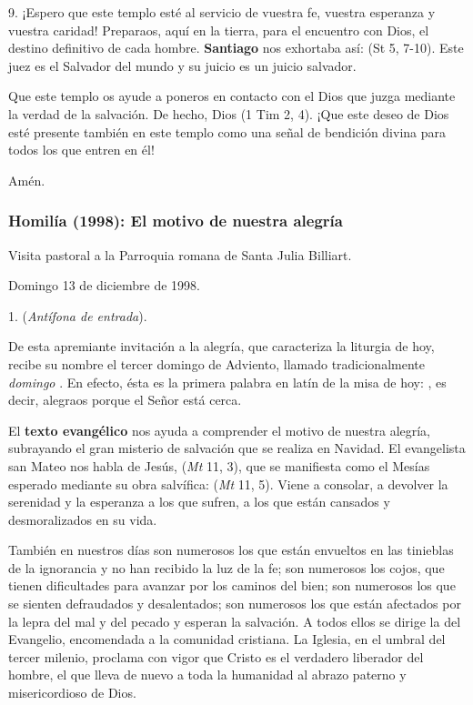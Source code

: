 9. ¡Espero que este templo esté al servicio de vuestra fe, vuestra esperanza y vuestra caridad! Preparaos, aquí en la tierra, para el encuentro con Dios, el destino definitivo de cada hombre. \textbf{Santiago} nos exhortaba así:  (St 5, 7-10). Este juez es el Salvador del mundo y su juicio es un juicio salvador.

Que este templo os ayude a poneros en contacto con el Dios que juzga mediante la verdad de la salvación. De hecho, Dios  (1 Tim 2, 4). ¡Que este deseo de Dios esté presente también en este templo como una señal de bendición divina para todos los que entren en él!

Amén.



\subsubsection{Homilía (1998): El motivo de nuestra alegría}

Visita pastoral a la Parroquia romana de Santa Julia Billiart.

Domingo 13 de diciembre de 1998.

1.  (\emph{Antífona de entrada}).

De esta apremiante invitación a la alegría, que caracteriza la liturgia de hoy, recibe su nombre el tercer domingo de Adviento, llamado tradicionalmente \emph{domingo }. En efecto, ésta es la primera palabra en latín de la misa de hoy: , es decir, alegraos porque el Señor está cerca.

El \textbf{texto evangélico} nos ayuda a comprender el motivo de nuestra alegría, subrayando el gran misterio de salvación que se realiza en Navidad. El evangelista san Mateo nos habla de Jesús,  (\emph{Mt} 11, 3), que se manifiesta como el Mesías esperado mediante su obra salvífica:  (\emph{Mt} 11, 5). Viene a consolar, a devolver la serenidad y la esperanza a los que sufren, a los que están cansados y desmoralizados en su vida.

También en nuestros días son numerosos los que están envueltos en las tinieblas de la ignorancia y no han recibido la luz de la fe; son numerosos los cojos, que tienen dificultades para avanzar por los caminos del bien; son numerosos los que se sienten defraudados y desalentados; son numerosos los que están afectados por la lepra del mal y del pecado y esperan la salvación. A todos ellos se dirige la  del Evangelio, encomendada a la comunidad cristiana. La Iglesia, en el umbral del tercer milenio, proclama con vigor que Cristo es el verdadero liberador del hombre, el que lleva de nuevo a toda la humanidad al abrazo paterno y misericordioso de Dios.

